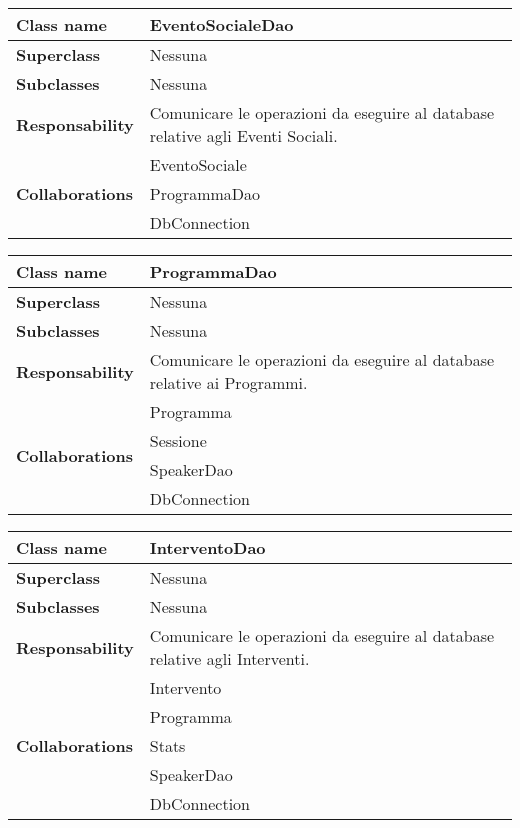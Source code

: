 \begin{table}[h!]
	\begin{tabular}{|l|l|}
		\hline 
		\textbf{Class name} & EventoSocialeDao
		\\ \hline
		\textbf{Superclass} & Nessuna
		\\ \hline
		\multirow{1}{*}{\textbf{Subclasses}} & Nessuna
		\\ \hline
		\textbf{Responsability} & Comunicare le operazioni da eseguire al database relative agli Eventi Sociali.
		\\ \hline
		\multirow{3}{*}{\textbf{Collaborations}} & EventoSociale \\ 
		& ProgrammaDao \\
		& DbConnection \\ \hline
	\end{tabular}
\end{table}

\begin{table}[h!]
	\begin{tabular}{|l|l|}
		\hline 
		\textbf{Class name} & ProgrammaDao
		\\ \hline
		\textbf{Superclass} & Nessuna
		\\ \hline
		\multirow{1}{*}{\textbf{Subclasses}} & Nessuna
		\\ \hline
		\textbf{Responsability} & Comunicare le operazioni da eseguire al database relative ai Programmi.
		\\ \hline
		\multirow{4}{*}{\textbf{Collaborations}} & Programma \\ 
		& Sessione \\
		& SpeakerDao \\
		& DbConnection \\ \hline
	\end{tabular}
\end{table}

\begin{table}[h!]
	\begin{tabular}{|l|l|}
		\hline 
		\textbf{Class name} & InterventoDao
		\\ \hline
		\textbf{Superclass} & Nessuna
		\\ \hline
		\multirow{1}{*}{\textbf{Subclasses}} & Nessuna
		\\ \hline
		\textbf{Responsability} & Comunicare le operazioni da eseguire al database relative agli Interventi.
		\\ \hline
		\multirow{5}{*}{\textbf{Collaborations}} & Intervento \\ 
		& Programma \\
		& Stats \\
		& SpeakerDao \\
		& DbConnection \\ \hline
	\end{tabular}
\end{table}

